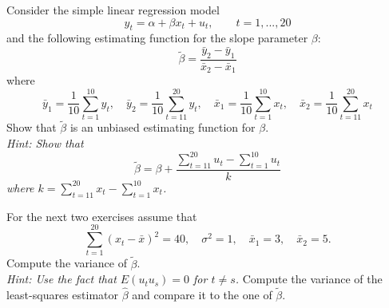 \documentclass{article}
\begin{document}
\begin{Exercise}[title=(Estimating Functions)]
Consider the simple linear regression model
$$y_t = \alpha + \beta x_t + u_t, \qquad t=1,...,20$$
and the following estimating function for the slope parameter $\beta$:
$$\tilde{\beta} = \frac{\bar{y}_2-\bar{y}_1}{\bar{x}_2 -\bar{x}_1}$$
where
$$\bar{y}_1 = \frac{1}{10} \sum_{t=1}^{10} y_t, \quad \bar{y}_2 = \frac{1}{10} \sum_{t=11}^{20} y_t, \quad \bar{x}_1 = \frac{1}{10} \sum_{t=1}^{10} x_t, \quad \bar{x}_2 = \frac{1}{10} \sum_{t=11}^{20} x_t$$
\Question Show that $\tilde{\beta}$ is an unbiased estimating function for $\beta$.\\\textit{Hint: Show that }$$\tilde{\beta} = \beta + \frac{\sum_{t=11}^{20} u_t - \sum_{t=1}^{10}u_t}{k}$$
	\textit{where $k=\sum_{t=11}^{20} x_t - \sum_{t=1}^{10} x_t$.}

\Question For the next two exercises assume that 
$$\sum_{t=1}^{20}(x_t - \bar{x})^2 = 40, \quad \sigma^2=1, \quad \bar{x}_1 = 3, \quad \bar{x}_2 = 5.$$
\subQuestion Compute the variance of $\tilde{\beta}$.\\
	\textit{Hint: Use the fact that $E(u_t u_s) = 0$ for $t\neq s$.}
\subQuestion Compute the variance of the least-squares estimator $\hat{\beta}$ and compare it to the one of $\tilde{\beta}$.
\end{Exercise}
\end{document}
